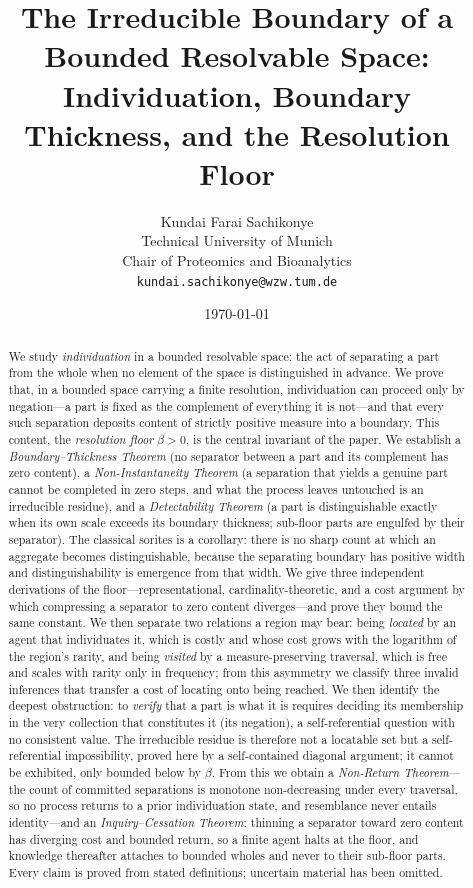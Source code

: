 \documentclass[11pt,a4paper]{article}
\title{\textbf{The Irreducible Boundary of a Bounded Resolvable Space:\\[2pt]
Individuation, Boundary Thickness, and the Resolution Floor}}
\author{%
Kundai Farai Sachikonye\\
\small Technical University of Munich\\
\small Chair of Proteomics and Bioanalytics\\
\small \texttt{kundai.sachikonye@wzw.tum.de}}
\date{\today}
\theoremstyle{thmstyle}
\theoremstyle{definition}
\theoremstyle{remark}
\newcommand{\thick}{\beta}
\begin{document}
\maketitle

\begin{abstract}
\noindent
We study \emph{individuation} in a bounded resolvable space: the act of
separating a part from the whole when no element of the space is
distinguished in advance. We prove that, in a bounded space carrying a
finite resolution, individuation can proceed only by negation---a part is
fixed as the complement of everything it is not---and that every such
separation deposits content of strictly positive measure into a boundary.
This content, the \emph{resolution floor} $\thick>0$, is the central
invariant of the paper. We establish a \emph{Boundary--Thickness Theorem}
(no separator between a part and its complement has zero content), a
\emph{Non-Instantaneity Theorem} (a separation that yields a genuine part
cannot be completed in zero steps, and what the process leaves untouched is
an irreducible residue), and a \emph{Detectability Theorem} (a part is
distinguishable exactly when its own scale exceeds its boundary thickness;
sub-floor parts are engulfed by their separator). The classical sorites is a
corollary: there is no sharp count at which an aggregate becomes
distinguishable, because the separating boundary has positive width and
distinguishability is emergence from that width. We give three independent
derivations of the floor---representational, cardinality-theoretic, and a
cost argument by which compressing a separator to zero content diverges---and
prove they bound the same constant. We then separate two relations a region may
bear: being \emph{located} by an agent that individuates it, which is costly and
whose cost grows with the logarithm of the region's rarity, and being
\emph{visited} by a measure-preserving traversal, which is free and scales with
rarity only in frequency; from this asymmetry we classify three invalid
inferences that transfer a cost of locating onto being reached. We then identify
the deepest obstruction:
to \emph{verify} that a part is what it is requires deciding its membership
in the very collection that constitutes it (its negation), a self-referential
question with no consistent value. The irreducible residue is therefore not a
locatable set but a self-referential impossibility, proved here by a
self-contained diagonal argument; it cannot be exhibited, only bounded below
by $\thick$. From this we obtain a \emph{Non-Return Theorem}---the count of
committed separations is monotone non-decreasing under every traversal, so no
process returns to a prior individuation state, and resemblance never entails
identity---and an \emph{Inquiry--Cessation Theorem}: thinning a separator
toward zero content has diverging cost and bounded return, so a finite agent
halts at the floor, and knowledge thereafter attaches to bounded wholes and
never to their sub-floor parts. Every claim is proved from stated definitions;
uncertain material has been omitted.
\end{abstract}
\end{document}
